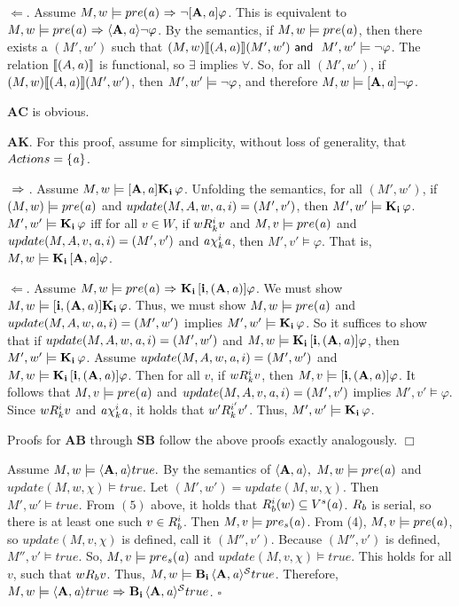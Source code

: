 $\Leftarrow$. Assume $M,w \models pre(\mathit{a}) {\ \Rightarrow \ } {\neg} \mathbf{[A,\mathit{a}]}\varphi$. This is equivalent to $M,w \models pre(\mathit{a}) {\ \Rightarrow \ } \mathbf{\langle A,\mathit{a}\rangle}{\neg} \varphi$.  By the semantics, if $M,w \models pre(\mathit{a})$, then there exists a $(M',w')$ such that $(M,w)\llbracket (A,\mathit{a})\rrbracket (M',w') \textsf{\ and \ } M',w' \models {\neg} \varphi$. The relation $\llbracket (A,\mathit{a})\rrbracket$ is functional, so $\exists$ implies $\forall$. So, for all $(M',w')$, if $(M,w)\llbracket (A,\mathit{a})\rrbracket (M',w')$, then $M',w' \models {\neg} \varphi$, and therefore $M,w\models \mathbf{[A,\mathit{a}]}{\neg} \varphi$.

$\mathbf{AC}$ is obvious.

$\mathbf{AK}$. For this proof, assume for simplicity, without loss of generality, that $Actions = \{\mathit{a}\}$.

${\ \Rightarrow \ }$. Assume $M,w \models \mathbf{[A,\mathit{a}]}\mathbf{K}_{\mathbf{i}}\,\varphi$. Unfolding the semantics, for all $(M',w')$, if $(M,w)\models pre(\mathit{a})$ and $update(M,A,w,\mathit{a},\\i)=(M',v')$, then $M',w'\models\mathbf{K}_{\mathbf{i}}\,\varphi$. $M',w'\models \mathbf{K}_{\mathbf{i}}\,\varphi$ iff for all $v\in W$, if $wR_{k}^iv$ and $M,v\models pre(\mathit{a})$ and $update(M,A,v,\mathit{a},i)=(M',v')$ and  $\mathit{a}\chi_{k}^i\mathit{a}$, then $M',v'\models\varphi$. That is, $M,w\models \mathbf{K}_{\mathbf{i}}\,\mathbf{[A,\mathit{a}]}\varphi$. 

$\Leftarrow$. Assume $M,w \models pre(\mathit{a}) {\ \Rightarrow \ } \mathbf{K}_{\mathbf{i}}\,\mathbf{[i,(A,\mathit{a})]}\varphi$. We must show $M,w \models \mathbf{[i,(A,\mathit{a})]}\\\mathbf{K}_{\mathbf{i}}\,\varphi$. Thus, we must show $M,w \models pre(\mathit{a})$ and $update(M,A,w,\mathit{a},i)=(M',w')$ implies $M',w' \models \mathbf{K}_{\mathbf{i}}\,\varphi$. So it suffices to show that if $update(M,A,w,\mathit{a},i)=(M',w')$ and $M,w\models \mathbf{K}_{\mathbf{i}}\,\mathbf{[i,(A,\mathit{a})]}\varphi$, then $M',w'\models \mathbf{K}_{\mathbf{i}}\,\varphi$. Assume $update(M,A,w,\\\mathit{a},i)=(M',w')$ and $M,w\models\mathbf{K}_{\mathbf{i}}\,\mathbf{[i,(A,\mathit{a})]}\varphi$. Then for all $v$, if $wR_{k}^iv$, then $M,v\models\mathbf{[i,(A,\mathit{a})]}\varphi$. It follows that $M,v\models pre(\mathit{a})$ and $update(M,A,v,\mathit{a},i)=(M',v')$ implies $M',v'\models\varphi$. Since $wR_{k}^iv$ and $\mathit{a}\chi_{k}^i\mathit{a}$, it holds that $w'R_{k}^{i'}v'$. Thus, $M',w'\models\mathbf{K}_{\mathbf{i}}\,\varphi$.

Proofs for $\mathbf{AB}$ through $\mathbf{SB}$ follow the above proofs exactly analogously. $\Box$ 

Assume $M,w \models \mathbf{\langle A,\mathit{a}\rangle}true.$ By the semantics of $\mathbf{\langle A,\mathit{a}\rangle},$ $M,w \models pre(\mathit{a})$ and $update(M,w,\chi)\models true$. Let $(M',w') = update(M,w,\chi)$. Then $M',w' \models true$. From $(5)$ above, it holds that $R_{b}^i (w) \subseteq V^s (\mathit{a})$. $R_{b}$ is serial, so there is at least one such $v \in R_{b}^i$. Then $M,v \models pre_s(\mathit{a})$. From (4), $M,v \models pre(\mathit{a})$, so $update(M,v,\chi)$ is defined, call it $(M'',v')$. Because $(M'',v')$ is defined, $M'',v' \models true$. So, $M,v \models pre_s(\mathit{a})$ and $update(M,v,\chi)\models true$. This holds for all $v$, such that $wR_{b}v$. Thus, $M,w \models \mathbf{B}_{\mathbf{i}}\,\mathbf{\langle A,\mathit{a}\rangle^\mathcal{S}}true$. Therefore, $M,w \models \mathbf{\langle A,\mathit{a}\rangle}true {\ \Rightarrow \ } \mathbf{B}_{\mathbf{i}}\,\mathbf{\langle A,\mathit{a}\rangle^\mathcal{S}}true$. $\square$ 

